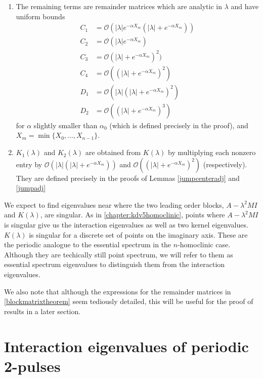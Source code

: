 \documentclass[thesis.tex]{subfiles}
\begin{document}
\begin{theorem}
\begin{enumerate}
\item The remaining terms are remainder matrices which are analytic in $\lambda$ and have uniform bounds
\begin{align*}
C_1 &= \mathcal{O}(|\lambda|e^{-\alpha X_m}(|\lambda| + e^{-\alpha X_m})) \\
C_2 &= \mathcal{O}(|\lambda|e^{-\alpha X_m}) \\
C_3 &= \mathcal{O} (|\lambda| + e^{-\alpha X_m})^2) \\
C_4 &= \mathcal{O}((|\lambda| + e^{-\alpha X_m})^2) \\
D_1 &= \mathcal{O}(|\lambda|(|\lambda| + e^{-\alpha X_m})^2) \\
D_2 &= \mathcal{O}((|\lambda| + e^{-\alpha X_m})^3)
\end{align*}
for $\alpha$ slightly smaller than $\alpha_0$ (which is defined precisely in the proof), and $X_m = \min\{X_0, \dots, X_{n-1}\}$.

\item $K_1(\lambda)$ and $K_2(\lambda)$ are obtained from $K(\lambda)$ by multiplying each nonzero entry by $\mathcal{O}(|\lambda|(|\lambda| + e^{-\alpha X_m}))$ and $\mathcal{O}((|\lambda| + e^{-\alpha X_m})^2)$ (respectively). They are defined precisely in the proofs of Lemmas \ref{jumpcenteradj} and \ref{jumpadj}
\end{enumerate}
\end{theorem}

We expect to find eigenvalues near where the two leading order blocks, $A - \lambda^2 MI$ and $K(\lambda)$, are singular. As in \cref{chapter:kdv5homoclinic}, points where $A - \lambda^2 MI$ is singular give us the interaction eigenvalues as well as two kernel eigenvalues. $K(\lambda)$ is singular for a discrete set of points on the imaginary axis. These are the periodic analogue to the essential spectrum in the $n$-homoclinic case. Although they are techically still point spectrum, we will refer to them as essential spectrum eigenvalues to distinguish them from the interaction eigenvalues.

We also note that although the expressions for the remainder matrices in \cref{blockmatrixtheorem} seem tediously detailed, this will be useful for the proof of results in a later section.

\section{Interaction eigenvalues of periodic 2-pulses}
\end{document}
